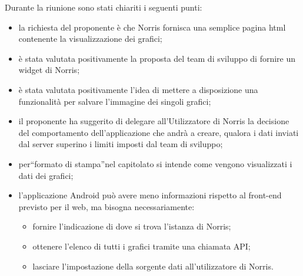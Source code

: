 Durante la riunione sono stati chiariti i seguenti punti:
\begin{itemize}
\item la richiesta del proponente è che Norris fornisca una semplice pagina html contenente la visualizzazione dei grafici;
\item è stata valutata positivamente la proposta del team di sviluppo di fornire un widget di Norris;
\item è stata valutata positivamente l'idea di mettere a disposizione una funzionalità per salvare l'immagine dei singoli grafici;
\item il proponente ha suggerito di delegare all'Utilizzatore di Norris la decisione del comportamento dell'applicazione che andrà a creare, qualora i dati inviati dal server superino i limiti imposti dal team di sviluppo;
\item per“formato di stampa”nel capitolato si intende come vengono visualizzati i dati dei grafici;
\item l'applicazione Android può avere meno informazioni rispetto al front-end previsto per il web, ma bisogna necessariamente:
\begin{itemize}
\item fornire l'indicazione di dove si trova l'istanza di Norris;
\item ottenere l'elenco di tutti i grafici tramite una chiamata API;
\item lasciare l'impostazione della sorgente dati all'utilizzatore di Norris.
\end{itemize}
\end{itemize}
